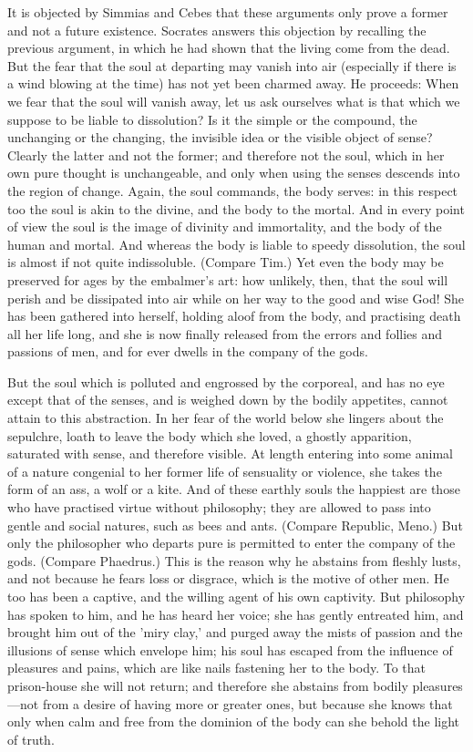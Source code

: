 It is objected by Simmias and Cebes that these arguments only prove a
former and not a future existence. Socrates answers this objection by
recalling the previous argument, in which he had shown that the living
come from the dead. But the fear that the soul at departing may vanish
into air (especially if there is a wind blowing at the time) has not yet
been charmed away. He proceeds: When we fear that the soul will vanish
away, let us ask ourselves what is that which we suppose to be liable to
dissolution? Is it the simple or the compound, the unchanging or the
changing, the invisible idea or the visible object of sense? Clearly the
latter and not the former; and therefore not the soul, which in her own
pure thought is unchangeable, and only when using the senses descends into
the region of change. Again, the soul commands, the body serves: in this
respect too the soul is akin to the divine, and the body to the mortal.
And in every point of view the soul is the image of divinity and
immortality, and the body of the human and mortal. And whereas the body is
liable to speedy dissolution, the soul is almost if not quite
indissoluble. (Compare Tim.) Yet even the body may be preserved for ages
by the embalmer's art: how unlikely, then, that the soul will perish and
be dissipated into air while on her way to the good and wise God! She has
been gathered into herself, holding aloof from the body, and practising
death all her life long, and she is now finally released from the errors
and follies and passions of men, and for ever dwells in the company of the
gods.

But the soul which is polluted and engrossed by the corporeal, and has no
eye except that of the senses, and is weighed down by the bodily
appetites, cannot attain to this abstraction. In her fear of the world
below she lingers about the sepulchre, loath to leave the body which she
loved, a ghostly apparition, saturated with sense, and therefore visible.
At length entering into some animal of a nature congenial to her former
life of sensuality or violence, she takes the form of an ass, a wolf or a
kite. And of these earthly souls the happiest are those who have practised
virtue without philosophy; they are allowed to pass into gentle and social
natures, such as bees and ants. (Compare Republic, Meno.) But only the
philosopher who departs pure is permitted to enter the company of the
gods. (Compare Phaedrus.) This is the reason why he abstains from fleshly
lusts, and not because he fears loss or disgrace, which is the motive of
other men. He too has been a captive, and the willing agent of his own
captivity. But philosophy has spoken to him, and he has heard her voice;
she has gently entreated him, and brought him out of the 'miry clay,' and
purged away the mists of passion and the illusions of sense which envelope
him; his soul has escaped from the influence of pleasures and pains, which
are like nails fastening her to the body. To that prison-house she will
not return; and therefore she abstains from bodily pleasures—not
from a desire of having more or greater ones, but because she knows that
only when calm and free from the dominion of the body can she behold the
light of truth.

